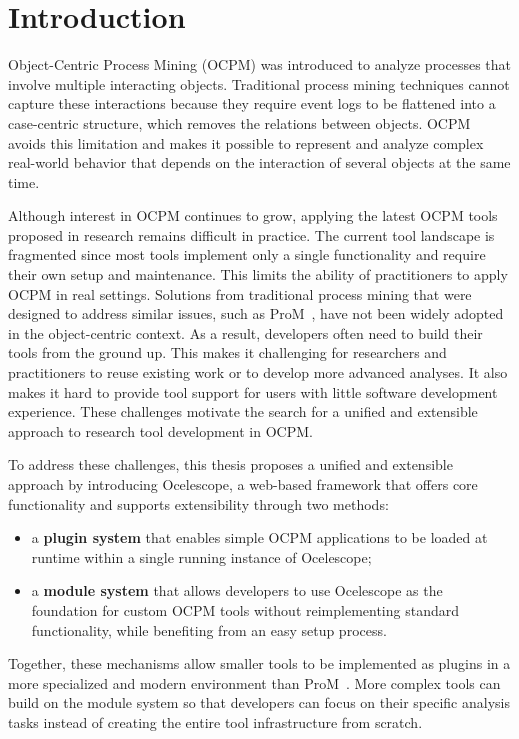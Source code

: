 \chapter{Introduction}
Object-Centric Process Mining (OCPM) was introduced to analyze processes that involve multiple interacting objects.
Traditional process mining techniques cannot capture these interactions because they require event logs to be flattened into a case-centric structure, which removes the relations between objects.
OCPM avoids this limitation and makes it possible to represent and analyze complex real-world behavior that depends on the interaction of several objects at the same time.

Although interest in OCPM continues to grow, applying the latest OCPM tools proposed in research remains difficult in practice.
The current tool landscape is fragmented since most tools implement only a single functionality and require their own setup and maintenance.
This limits the ability of practitioners to apply OCPM in real settings.
Solutions from traditional process mining that were designed to address similar issues, such as ProM~\cite{prom}, have not been widely adopted in the object-centric context.
As a result, developers often need to build their tools from the ground up.
This makes it challenging for researchers and practitioners to reuse existing work or to develop more advanced analyses.
It also makes it hard to provide tool support for users with little software development experience.
These challenges motivate the search for a unified and extensible approach to research tool development in OCPM.

To address these challenges, this thesis proposes a unified and extensible approach by introducing Ocelescope, a web-based framework that offers core functionality and supports extensibility through two methods:
\begin{itemize}
	\item a \textbf{plugin system} that enables simple OCPM applications to be loaded at runtime within a single running instance of Ocelescope;
	\item a \textbf{module system} that allows developers to use Ocelescope as the foundation for custom OCPM tools without reimplementing standard functionality, while benefiting from an easy setup process.
\end{itemize}
Together, these mechanisms allow smaller tools to be implemented as plugins in a more specialized and modern environment than ProM~\cite{prom}. More complex tools can build on the module system so that developers can focus on their specific analysis tasks instead of creating the entire tool infrastructure from scratch.

